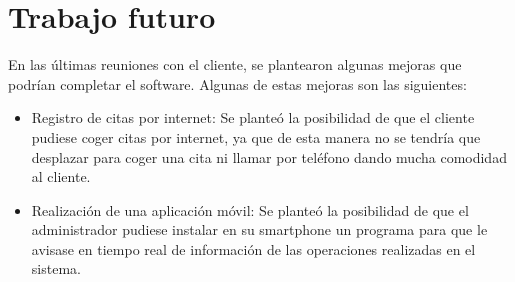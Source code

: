 \section{Trabajo futuro}

En las últimas reuniones con el cliente, se plantearon algunas mejoras que podrían completar el software. Algunas de estas mejoras son las siguientes:

\begin {itemize}
\item Registro de citas por internet: Se planteó la posibilidad de que el cliente pudiese coger citas por internet, ya que de esta manera no se tendría que desplazar para coger una cita ni llamar por teléfono dando mucha comodidad al cliente.
\item Realización de una aplicación móvil: Se planteó la posibilidad de que el administrador pudiese instalar en su smartphone un programa para que le avisase en tiempo real de información de las operaciones realizadas en el sistema.
\end{itemize}